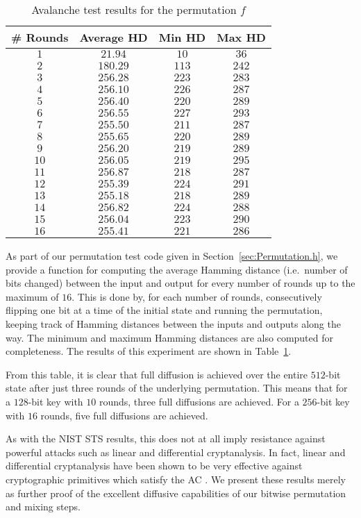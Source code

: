\begin{table}[ht]
\centering
\begin{tabular}{c|c|c|c}
\textbf{\# Rounds} & \textbf{Average HD} & \textbf{Min HD} & \textbf{Max HD} \\
\hline
$1$  &  $21.94$ & $10$  & $36$ \\
$2$  & $180.29$ & $113$ & $242$ \\
$3$  & $256.28$ & $223$ & $283$ \\
$4$  & $256.10$ & $226$ & $287$ \\
$5$  & $256.40$ & $220$ & $289$ \\
$6$  & $256.55$ & $227$ & $293$ \\
$7$  & $255.50$ & $211$ & $287$ \\
$8$  & $255.65$ & $220$ & $289$ \\
$9$  & $256.20$ & $219$ & $289$ \\
$10$ & $256.05$ & $219$ & $295$ \\
$11$ & $256.87$ & $218$ & $287$ \\
$12$ & $255.39$ & $224$ & $291$ \\
$13$ & $255.18$ & $218$ & $289$ \\
$14$ & $256.82$ & $224$ & $288$ \\
$15$ & $256.04$ & $223$ & $290$ \\
$16$ & $255.41$ & $221$ & $286$ \\
\end{tabular} 
\caption{Avalanche test results for the permutation $f$}
\label{tab:AvalancheTesting}
\end{table}

As part of our permutation test code given in Section~\ref{sec:Permutation.h}, we provide a function for computing the average Hamming distance (i.e.\ number of bits changed) between the input and output for every number of rounds up to the maximum of $16$. 
This is done by, for each number of rounds, consecutively flipping one bit at a time of the initial state and running the permutation, keeping track of Hamming distances between the inputs and outputs along the way.
The minimum and maximum Hamming distances are also computed for completeness.
The results of this experiment are shown in Table~\ref{tab:AvalancheTesting}.

From this table, it is clear that full diffusion is achieved over the entire $512$-bit state after just three rounds of the underlying permutation.
This means that for a $128$-bit key with $10$ rounds, three full diffusions are achieved.
For a $256$-bit key with $16$ rounds, five full diffusions are achieved.

As with the NIST STS results, this does not at all imply resistance against powerful attacks such as linear and differential cryptanalysis.
In fact, linear and differential cryptanalysis have been shown to be very effective against cryptographic primitives which satisfy the AC \cite{Heys1995_Avalanche}.
We present these results merely as further proof of the excellent diffusive capabilities of our bitwise permutation and mixing steps.

